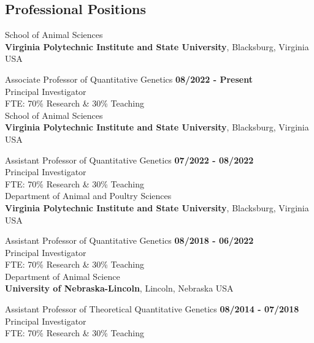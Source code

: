 \documentclass[margin,line,10pt]{res}
\begin{document}
\begin{resume}
\vspace{0.4cm}
\section{\sc Professional Positions}


School of Animal Sciences\\
{\bf Virginia Polytechnic Institute and State University}, Blacksburg, Virginia USA
\vspace{-.3cm}

Associate Professor of Quantitative Genetics   \hfill {\bf 08/2022 - Present}\\
Principal Investigator \\
FTE: 70\% Research \& 30\% Teaching \\


School of Animal Sciences\\
{\bf Virginia Polytechnic Institute and State University}, Blacksburg, Virginia USA
\vspace{-.3cm}

Assistant Professor of Quantitative Genetics   \hfill {\bf 07/2022 - 08/2022}\\
Principal Investigator \\
FTE: 70\% Research \& 30\% Teaching \\


Department of Animal and Poultry Sciences\\
{\bf Virginia Polytechnic Institute and State University}, Blacksburg, Virginia USA
\vspace{-.3cm}

Assistant Professor of Quantitative Genetics   \hfill {\bf 08/2018 - 06/2022}\\
Principal Investigator \\
FTE: 70\% Research \& 30\% Teaching \\



Department of Animal Science\\
{\bf University of Nebraska-Lincoln}, Lincoln, Nebraska USA
\vspace{-.35cm}

Assistant Professor of Theoretical Quantitative Genetics   \hfill {\bf 08/2014 - 07/2018}\\
Principal Investigator \\
FTE: 70\% Research \& 30\% Teaching \\





\end{resume}
\end{document}
